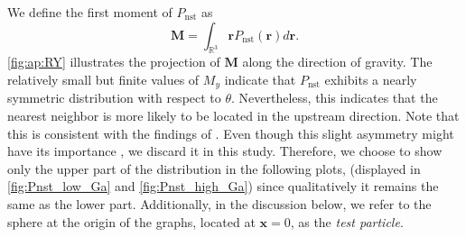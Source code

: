 We define the first moment of $P_\text{nst}$ as
\begin{equation}
 \textbf{M} = \int_{\mathbb{R}^3} \textbf{r} P_\text{nst}(\textbf{r}) d\textbf{r}.
\end{equation}
\ref{fig:ap:RY} illustrates the projection of $\textbf{M}$ along the direction of gravity. 
The relatively small but finite values of $M_y$ indicate that $P_\text{nst}$ exhibits a nearly symmetric distribution with respect to $\theta$.
Nevertheless, this indicates that the nearest neighbor is more likely to be located in the upstream direction. 
Note that this is consistent with the findings of \citet{zhang2023evolution}.
Even though this slight asymmetry might have its importance \cite{zhang2023evolution}, we discard it in this study. 
Therefore, we choose to show only the upper part of the distribution in the following plots, (displayed in \ref{fig:Pnst_low_Ga} and \ref{fig:Pnst_high_Ga}) since qualitatively it remains the same as the lower part.  
Additionally, in the discussion below, we refer to the sphere at the origin of the graphs, located at $\textbf{x}=0$, as the \textit{test particle}.%

